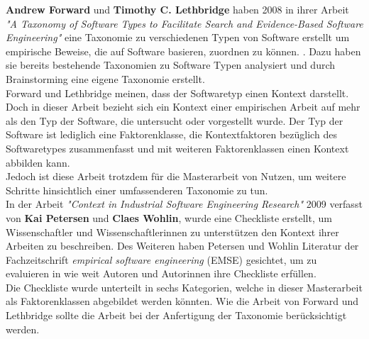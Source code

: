  
\textbf{Andrew Forward} und \textbf{Timothy C. Lethbridge} haben 2008 in ihrer Arbeit \textit{"A Taxonomy of Software Types to Facilitate Search and
Evidence-Based Software Engineering"} eine Taxonomie zu verschiedenen Typen von Software erstellt um empirische Beweise, die auf Software basieren, zuordnen zu können.  \cite{taxonomy_software_types}. Dazu haben sie bereits bestehende Taxonomien zu Software Typen analysiert und durch Brainstorming eine eigene Taxonomie erstellt.\\
Forward und Lethbridge meinen, dass der Softwaretyp einen Kontext darstellt. Doch in dieser Arbeit bezieht sich ein Kontext einer empirischen Arbeit auf mehr als den Typ der Software, die untersucht oder vorgestellt wurde. Der Typ der Software ist lediglich eine Faktorenklasse, die Kontextfaktoren bezüglich des Softwaretypes zusammenfasst und mit weiteren Faktorenklassen einen Kontext abbilden kann.\\ 
Jedoch ist diese Arbeit trotzdem für die Masterarbeit von Nutzen, um weitere Schritte hinsichtlich einer umfassenderen Taxonomie zu tun. \\

In der Arbeit \textit{"Context in Industrial Software Engineering Research"} 2009 verfasst von \textbf{Kai Petersen} und \textbf{Claes Wohlin}, wurde eine Checkliste erstellt, um Wissenschaftler und Wissenschaftlerinnen zu unterstützen den Kontext ihrer Arbeiten zu beschreiben. \cite{contextIndustrialSE} Des Weiteren haben Petersen und Wohlin Literatur der Fachzeitschrift \textit{empirical software engineering} (EMSE) gesichtet, um zu evaluieren in wie weit Autoren und Autorinnen ihre Checkliste erfüllen. \\
Die Checkliste wurde unterteilt in sechs Kategorien, welche in dieser Masterarbeit als Faktorenklassen abgebildet werden könnten. Wie die Arbeit von Forward und Lethbridge sollte die Arbeit bei der Anfertigung der Taxonomie berücksichtigt werden. \\

